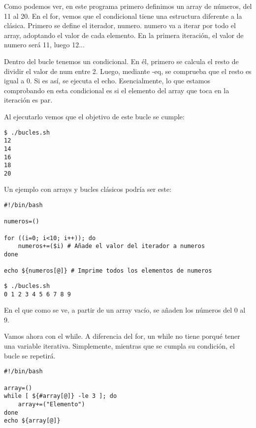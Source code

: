 Como podemos ver, en este programa primero definimos un array de números, del 11 al 20. En el for, vemos que el condicional tiene una estructura diferente a la clásica. Primero se define el iterador, numero. numero va a iterar por todo el array, adoptando el valor de cada elemento. En la primera iteración, el valor de numero será 11, luego 12...

Dentro del bucle tenemos un condicional. En él, primero se calcula el resto de dividir el valor de num entre 2. Luego, mediante -eq, se comprueba que el resto es igual a 0. Si es así, se ejecuta el echo. Esencialmente, lo que estamos comprobando en esta condicional es si el elemento del array que toca en la iteración es par.

Al ejecutarlo vemos que el objetivo de este bucle se cumple:

\begin{tcolorbox-code}
\begin{lstlisting}
$ ./bucles.sh
12
14
16
18
20
\end{lstlisting}
\end{tcolorbox-code}

Un ejemplo con arrays y bucles clásicos podría ser este:

\begin{tcolorbox-code}
\begin{lstlisting}
#!/bin/bash

numeros=()

for ((i=0; i<10; i++)); do
	numeros+=($i) # Añade el valor del iterador a numeros
done

echo ${numeros[@]} # Imprime todos los elementos de numeros
\end{lstlisting}
\end{tcolorbox-code}

\begin{tcolorbox-code}
\begin{lstlisting}
$ ./bucles.sh
0 1 2 3 4 5 6 7 8 9
\end{lstlisting}
\end{tcolorbox-code}

En el que como se ve, a partir de un array vacío, se añaden los números del 0 al 9.

Vamos ahora con el while. A diferencia del for, un while no tiene porqué tener una variable iterativa. Simplemente, mientras que se cumpla su condición, el bucle se repetirá.

\begin{tcolorbox-code}
\begin{lstlisting}
#!/bin/bash

array=()
while [ ${#array[@]} -le 3 ]; do
	array+=("Elemento")
done
echo ${array[@]}
\end{lstlisting}
\end{tcolorbox-code}

